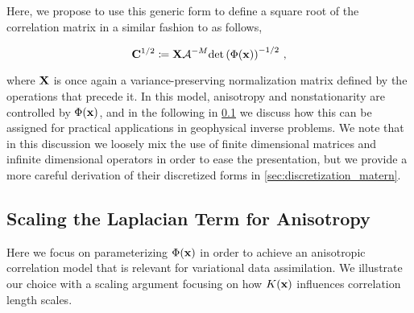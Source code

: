Here, we propose to use this generic form to define a square root of the
correlation matrix in a similar fashion to
\citet{weaver_correlation_2001, mirouze_representation_2010,
carrier_background-error_2010}
as follows,
\begin{linenomath*}\begin{equation}
    \mathbf{C}^{1/2} \coloneqq \mathbf{X}
    \mathcal{A}^{-M}
    \text{det}\left(\Phi(\mathbf{x})\right)^{-1/2} \, ,
    \label{eq:matern_operator}
\end{equation}\end{linenomath*}
where $\mathbf{X}$ is
once again a variance-preserving normalization matrix defined by the operations
that precede it.
In this model,
anisotropy and nonstationarity are controlled by
$\Phi(\mathbf{x})$, and in the following in \cref{ssec:scaling_laplacian}
we discuss how this can be assigned for
practical applications in geophysical inverse problems.
We note that in this discussion we loosely mix the use of
finite dimensional matrices and infinite dimensional operators
in order to ease the presentation, but we provide a more careful
derivation of their discretized forms in \cref{sec:discretization_matern}.

\subsection{Scaling the Laplacian Term for Anisotropy}
\label{ssec:scaling_laplacian}

Here we focus on parameterizing $\Phi(\mathbf{x})$ in order to achieve an anisotropic
correlation model that is relevant for variational data assimilation.
We illustrate our choice with a scaling argument focusing on how $K(\mathbf{x})$
influences correlation length scales.

